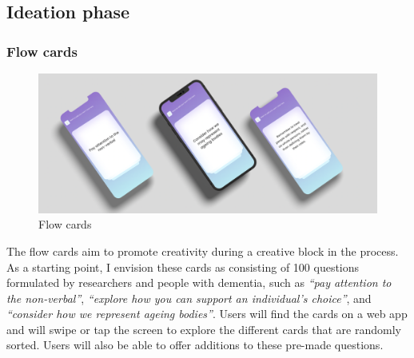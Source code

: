 \subsection{Ideation phase}
\subsubsection{Flow cards}
\begin{figure}[h]
\centering
\includegraphics[width=1\linewidth]{Images/D3Toolkit/Fig8.png}
\caption{Flow cards}
\label{fig:FlowCards}
\end{figure}
The flow cards aim to promote creativity during a creative block in the process. As a starting point, I envision these cards as consisting of 100 questions formulated by researchers and people with dementia, such as \textit{``pay attention to the non-verbal''}, \textit{``explore how you can support an individual’s choice''}, and \textit{``consider how we represent ageing bodies''}. Users will find the cards on a web app and will swipe or tap the screen to explore the different cards that are randomly sorted. Users will also be able to offer additions to these pre-made questions. 

